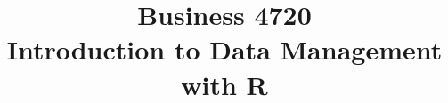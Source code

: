 \documentclass{article}
\title{Business 4720\\ \vspace{\baselineskip}
Introduction to Data Management with R}
\begin{document}
\maketitle

\vfill

\clearpage


\end{document}
